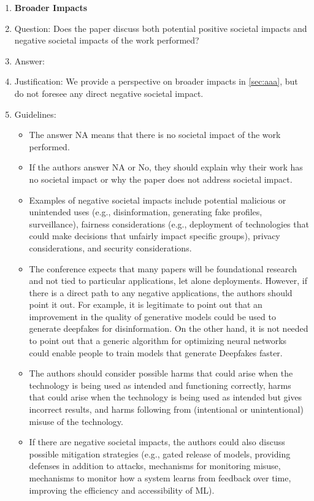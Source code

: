 \documentclass{article}
\theoremstyle{plain}
\theoremstyle{definition}
\theoremstyle{remark}
\theoremstyle{remark}
\begin{document}
\begin{enumerate}
\item {\bf Broader Impacts}
    \item[] Question: Does the paper discuss both potential positive societal impacts and negative societal impacts of the work performed?
    \item[] Answer: \answerYes{} %
    \item[] Justification: We provide a perspective on broader impacts in \autoref{sec:aaa}, but do not foresee any direct negative societal impact.
    \item[] Guidelines:
    \begin{itemize}
        \item The answer NA means that there is no societal impact of the work performed.
        \item If the authors answer NA or No, they should explain why their work has no societal impact or why the paper does not address societal impact.
        \item Examples of negative societal impacts include potential malicious or unintended uses (e.g., disinformation, generating fake profiles, surveillance), fairness considerations (e.g., deployment of technologies that could make decisions that unfairly impact specific groups), privacy considerations, and security considerations.
        \item The conference expects that many papers will be foundational research and not tied to particular applications, let alone deployments. However, if there is a direct path to any negative applications, the authors should point it out. For example, it is legitimate to point out that an improvement in the quality of generative models could be used to generate deepfakes for disinformation. On the other hand, it is not needed to point out that a generic algorithm for optimizing neural networks could enable people to train models that generate Deepfakes faster.
        \item The authors should consider possible harms that could arise when the technology is being used as intended and functioning correctly, harms that could arise when the technology is being used as intended but gives incorrect results, and harms following from (intentional or unintentional) misuse of the technology.
        \item If there are negative societal impacts, the authors could also discuss possible mitigation strategies (e.g., gated release of models, providing defenses in addition to attacks, mechanisms for monitoring misuse, mechanisms to monitor how a system learns from feedback over time, improving the efficiency and accessibility of ML).
    \end{itemize}
    

\end{enumerate}
\end{document}
